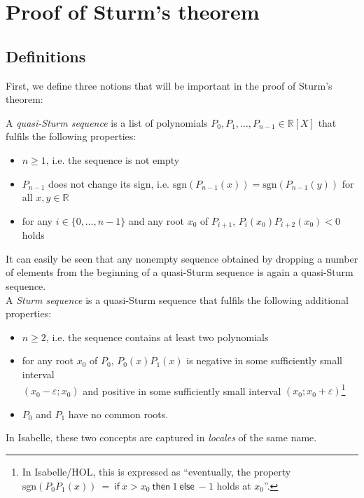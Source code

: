 \documentclass[11pt,a4paper,oneside]{article}
\newcommand{\RR}{\mathbb{R}}
\renewcommand{\epsilon}{\varepsilon}
\newcommand{\sgn}{\mathrm{sgn}}
\newcommand{\isabellehol}{\mbox{Isabelle}\slash HOL\xspace}
\begin{document}
\newpage
\section{Proof of Sturm's theorem}

\subsection{Definitions}
\label{sec:defs}

First, we define three notions that will be important in the proof of Sturm's theorem:

A \emph{quasi-Sturm sequence} is a list of polynomials $P_0,P_1,\ldots,P_{n-1} \in \RR[X]$ that fulfils the following properties:
\begin{itemize}
\item $n \geq 1$, i.e. the sequence is not empty
\item $P_{n-1}$ does not change its sign, i.e. $\sgn(P_{n-1}(x))=\sgn(P_{n-1}(y))$ for all $x,y\in\RR$
\item for any $i\in\{0,\ldots,n-1\}$ and any root $x_0$ of $P_{i+1}$, $P_{i}(x_0)P_{i+2}(x_0) < 0$ holds
\end{itemize}
It can easily be seen that any nonempty sequence obtained by dropping a number of elements from the beginning of a quasi-Sturm sequence is again a quasi-Sturm sequence.\\

A \emph{Sturm sequence} is a quasi-Sturm sequence that fulfils the following additional properties:
\begin{itemize}
\item $n \geq 2$, i.e. the sequence contains at least two polynomials
\item for any root $x_0$ of $P_0$, $P_0(x)P_1(x)$ is negative in some sufficiently small interval\\ \mbox{$(x_0-\epsilon;x_0)$} and positive in some sufficiently small interval $(x_0;x_0+\epsilon)$\footnote{
In \isabellehol, this is expressed as \enquote{eventually, the property $\sgn(P_0P_1(x))\ =\ \mathsf{if}\ x>x_0\ \mathsf{then}\ 1\ \mathsf{else}\ -1$ holds at $x_0$}.}
\item $P_0$ and $P_1$ have no common roots.
\end{itemize}

In Isabelle, these two concepts are captured in \emph{locales} of the same name.
\vskip5mm
\end{document}
